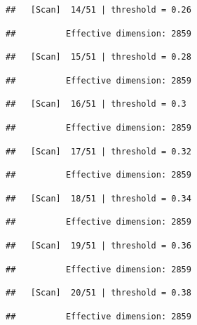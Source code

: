 \documentclass[
]{book}
\begin{document}
\begin{verbatim}
##   [Scan]  14/51 | threshold = 0.26
\end{verbatim}

\begin{verbatim}
##          Effective dimension: 2859
\end{verbatim}

\begin{verbatim}
##   [Scan]  15/51 | threshold = 0.28
\end{verbatim}

\begin{verbatim}
##          Effective dimension: 2859
\end{verbatim}

\begin{verbatim}
##   [Scan]  16/51 | threshold = 0.3
\end{verbatim}

\begin{verbatim}
##          Effective dimension: 2859
\end{verbatim}

\begin{verbatim}
##   [Scan]  17/51 | threshold = 0.32
\end{verbatim}

\begin{verbatim}
##          Effective dimension: 2859
\end{verbatim}

\begin{verbatim}
##   [Scan]  18/51 | threshold = 0.34
\end{verbatim}

\begin{verbatim}
##          Effective dimension: 2859
\end{verbatim}

\begin{verbatim}
##   [Scan]  19/51 | threshold = 0.36
\end{verbatim}

\begin{verbatim}
##          Effective dimension: 2859
\end{verbatim}

\begin{verbatim}
##   [Scan]  20/51 | threshold = 0.38
\end{verbatim}

\begin{verbatim}
##          Effective dimension: 2859
\end{verbatim}
\end{document}

